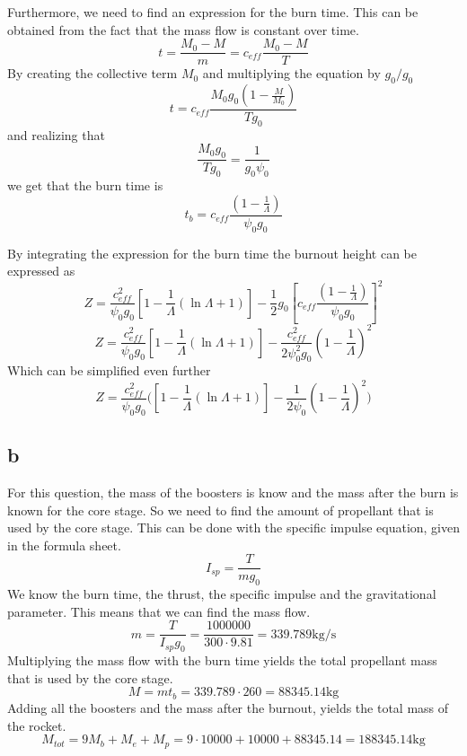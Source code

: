 Furthermore, we need to find an expression for the burn time. This can be obtained from the fact that the mass flow is constant over time.
\begin{equation}
t = \frac{M_0-M}{m}=c_{eff}\frac{M_0-M}{T}
\end{equation}
By creating the collective term $M_0$ and multiplying the equation by $g_0/g_0$
\begin{equation}
t = c_{eff}\frac{M_0g_0(1-\frac{M}{M_0})}{Tg_0}
\end{equation} 
and realizing that 
\begin{equation}
\frac{M_0g_0}{Tg_0}=\frac{1}{g_0\psi_0}
\end{equation}
we get that the burn time is 
\begin{equation}
t_b = c_{eff}\frac{(1-\frac{1}{\Lambda})}{\psi_0g_0}
\end{equation}

By integrating the expression for the burn time the burnout height can be expressed as
\begin{equation}
Z = \frac{c_{eff}^2}{\psi_0g_0}[1-\frac{1}{\Lambda}(\ln\Lambda+1)]-\frac{1}{2}g_0[c_{eff}\frac{(1-\frac{1}{\Lambda})}{\psi_0g_0}]^2
\end{equation}
\begin{equation}
Z = \frac{c_{eff}^2}{\psi_0g_0}[1-\frac{1}{\Lambda}(\ln\Lambda+1)]-\frac{c_{eff}^2}{2\psi_0^2g_0}(1-\frac{1}{\Lambda})^2
\end{equation}
Which can be simplified even further
\begin{equation}
Z = \frac{c_{eff}^2}{\psi_0g_0}\Bigg([1-\frac{1}{\Lambda}(\ln\Lambda+1)]-\frac{1}{2\psi_0}(1-\frac{1}{\Lambda})^2\Bigg)
\end{equation}

\subsection{b}
For this question, the mass of the boosters is know and the mass after the burn is known for the core stage. So we need to find the amount of propellant that is used by the core stage. This can be done with the specific impulse equation, given in the formula sheet.  
\begin{equation}
I_{sp}=\frac{T}{mg_0}
\end{equation}
We know the burn time, the thrust, the specific impulse and the gravitational parameter. This means that we can find the mass flow.
\begin{equation}
m = \frac{T}{I_{sp}g_0}=\frac{1000000}{300\cdot9.81}=339.789 \text{kg/s}
\end{equation}
Multiplying the mass flow with the burn time yields the total propellant mass that is used by the core stage.
\begin{equation}
M = mt_b = 339.789\cdot260=88345.14 \text{kg}
\end{equation}
Adding all the boosters and the mass after the burnout, yields the total mass of the rocket.
\begin{equation}
M_{tot} = 9M_b+M_e+M_p=9\cdot10000+10000+88345.14 = 188345.14 \text{kg}
\end{equation}

